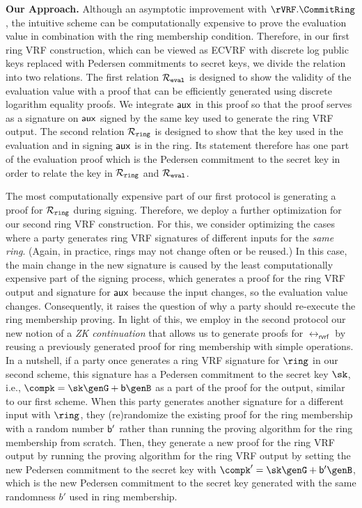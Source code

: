 \noindent \textbf{Our Approach.} Although an asymptotic improvement with $ \rVRF.\CommitRing $, 
the intuitive scheme can be computationally expensive to prove the evaluation value in combination with the ring membership condition. Therefore, in our first ring VRF construction, which can be viewed as ECVRF with discrete log public keys replaced with Pedersen commitments to secret keys, we divide the relation into two relations. The first relation $ \mathcal{R}_{\mathtt{eval}} $ is designed  to show the validity of the evaluation value with a proof that can be efficiently generated using discrete logarithm equality proofs.  We integrate $ \mathsf{aux} $ in this proof so that the proof serves as a signature on $ \mathsf{aux} $ signed by the same key used to generate the ring VRF output.   The second relation $ \mathcal{R}_{\mathtt{ring}} $ is designed to show that the key used in the evaluation and in signing $ \mathsf{aux} $ is in the ring. Its statement therefore has one part of the evaluation proof which is the Pedersen commitment to the secret key in order to relate the key in $ \mathcal{R}_{\mathtt{ring}} $ and $ \mathcal{R}_{\mathtt{eval}} $.

The most computationally expensive part of our first protocol is generating a proof for $ \mathcal{R}_{\mathtt{ring}} $ during signing. Therefore, we deploy a further optimization for our second ring VRF construction. For this,  we consider optimizing the cases where a party generates ring VRF signatures of different inputs for the \emph{same ring}. (Again, in practice, rings may not change often or be reused.) In this case, the main change in the new signature is caused by the least computationally expensive part of the signing process, which generates a proof for the ring VRF output and signature for $ \mathsf{aux} $  because the input changes, so the evaluation value changes.  Consequently, it raises the question of why a party should re-execute the ring membership proving.  In light of this, we employ in the second protocol our  new notion of a \emph{ZK continuation} that allows us to generate proofs for $ \rel_{\mathsf{rvrf}} $ by reusing a previously generated proof for ring membership with simple operations. 
In a nutshell, if a party once generates a ring VRF signature for $ \ring $ in our second scheme, this signature has a  Pedersen commitment to the secret key $ \sk $, i.e., $ \compk = \sk \genG + \openpk \genB $ as a part of the proof for the output, similar to our first scheme.  When this party generates another signature for a different input  with $ \ring $, they (re)randomize the  existing proof for the ring membership with a random number $ \mathsf{b}' $ rather than  running the proving algorithm for the ring membership from scratch. Then, they generate a new proof for the ring VRF output by running the proving algorithm for the ring VRF output by setting the new Pedersen commitment to the secret key with $ \compk' = \sk \genG + \openpk'\genB $, which is the new  Pedersen commitment to the secret key generated  with the same randomness $ b' $ used in ring membership.



